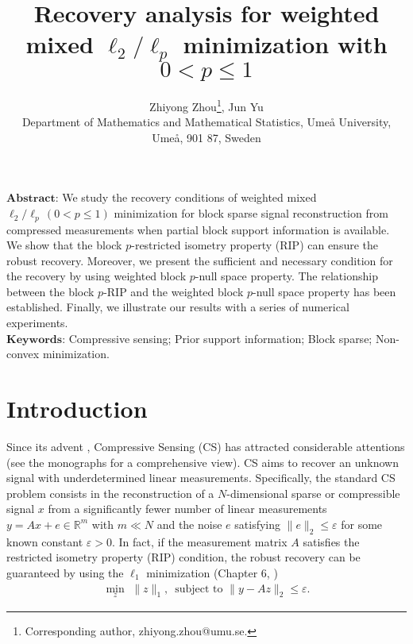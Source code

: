 \documentclass[11pt]{article}
\begin{document}
	\title{\bf Recovery analysis for weighted mixed $\ell_2/\ell_p$ minimization with $0<p\leq 1$}
	\author {Zhiyong Zhou\footnote{Corresponding author, zhiyong.zhou@umu.se.}, Jun Yu\\
		Department of Mathematics and Mathematical Statistics, Ume{\aa} University, \\Ume{\aa},
		901 87, Sweden}
	\maketitle
	\date{}
	\noindent
$\mathbf{Abstract}$: We study the recovery conditions of weighted mixed $\ell_2/\ell_p\,(0<p\leq 1)$ minimization for block sparse signal reconstruction from compressed measurements when partial block support information is available. We show that the block $p$-restricted isometry property (RIP) can ensure the robust recovery. Moreover, we present the sufficient and necessary condition for the recovery by using weighted block $p$-null space property. The relationship between the block $p$-RIP and the weighted block $p$-null space property has been established. Finally, we illustrate our results with a series of numerical experiments. \\
$\mathbf{Keywords}$: Compressive sensing; Prior support information; Block sparse; Non-convex minimization.

\section{Introduction}
Since its advent \cite{crt,ct1,ct2,d}, Compressive Sensing (CS) has attracted considerable attentions (see the monographs \cite{ek,fr} for a comprehensive view). CS aims to recover an unknown signal with underdetermined linear measurements. Specifically, the standard CS problem consists in the reconstruction of a $N$-dimensional sparse or compressible signal $x$ from a significantly fewer number of linear measurements $y=Ax+e\in\mathbb{R}^m$ with $m\ll N $ and the noise $e$ satisfying $\lVert e\rVert_2\leq \varepsilon$ for some known constant $\varepsilon>0$. In fact, if the measurement matrix $A$ satisfies the restricted isometry property (RIP) condition, the robust recovery can be guaranteed by using the $\ell_1$ minimization (Chapter 6, \cite{fr}) \begin{align}
\min\limits_{z}\,\,\lVert z\rVert_1,\,\,\,\text{subject to $\lVert y-Az\rVert_2\leq \varepsilon$}.
\end{align}
\end{document}
